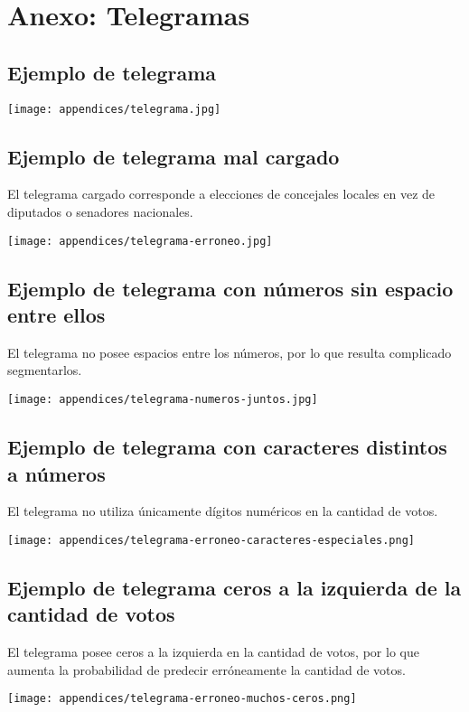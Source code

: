 \chapter{Anexo: Telegramas}

\section{Ejemplo de telegrama}
\label{anexo:telegrama}

\texttt{[image: appendices/telegrama.jpg]}

\section{Ejemplo de telegrama mal cargado}
\label{anexo:telegrama-erroneo}

El telegrama cargado corresponde a elecciones de concejales locales en vez de diputados o senadores nacionales.

\texttt{[image: appendices/telegrama-erroneo.jpg]}

\section{Ejemplo de telegrama con números sin espacio entre ellos}
\label{anexo:telegrama-numeros-juntos}

El telegrama no posee espacios entre los números, por lo que resulta complicado segmentarlos.

\texttt{[image: appendices/telegrama-numeros-juntos.jpg]}

\section{Ejemplo de telegrama con caracteres distintos a números}
\label{anexo:telegrama-erroneo-caracteres-especiales}

El telegrama no utiliza únicamente dígitos numéricos en la cantidad de votos.

\texttt{[image: appendices/telegrama-erroneo-caracteres-especiales.png]}

\section{Ejemplo de telegrama ceros a la izquierda de la cantidad de votos}
\label{anexo:telegrama-erroneo-muchos-ceros}

El telegrama posee ceros a la izquierda en la cantidad de votos, por lo que aumenta la probabilidad de predecir
erróneamente la cantidad de votos.

\texttt{[image: appendices/telegrama-erroneo-muchos-ceros.png]}
